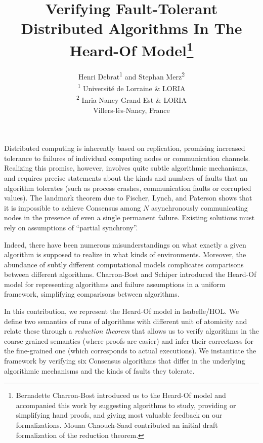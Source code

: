 \documentclass[11pt,a4paper]{article}
\begin{document}
\title{
  Verifying Fault-Tolerant Distributed Algorithms In The Heard-Of Model\thanks{%
    Bernadette Charron-Bost introduced us to the Heard-Of model and
    accompanied this work by suggesting algorithms to study, providing
    or simplifying hand proofs, and giving most valuable feedback on
    our formalizations. Mouna Chaouch-Saad contributed an initial
    draft formalization of the reduction theorem.
  }
}
\author{
  Henri Debrat\textsuperscript{1} and Stephan Merz\textsuperscript{2}\\
  \mbox{}\textsuperscript{1} Universit\'e de Lorraine \& LORIA\\
  \mbox{}\textsuperscript{2} Inria Nancy Grand-Est \& LORIA\\
  Villers-l\`es-Nancy, France
}
\maketitle

Distributed computing is inherently based on replication, promising
increased tolerance to failures of individual computing nodes or
communication channels. Realizing this promise, however, involves
quite subtle algorithmic mechanisms, and requires precise statements
about the kinds and numbers of faults that an algorithm tolerates (such
as process crashes, communication faults or corrupted values).  The
landmark theorem due to Fischer, Lynch, and Paterson shows that it is
impossible to achieve Consensus among $N$ asynchronously communicating
nodes in the presence of even a single permanent failure. Existing
solutions must rely on assumptions of ``partial synchrony''.

Indeed, there have been numerous misunderstandings on what exactly a given
algorithm is supposed to realize in what kinds of environments. Moreover, the
abundance of subtly different computational models complicates comparisons
between different algorithms. Charron-Bost and Schiper introduced the Heard-Of
model for representing algorithms and failure assumptions in a uniform
framework, simplifying comparisons between algorithms.

In this contribution, we represent the Heard-Of model in Isabelle/HOL. We define
two semantics of runs of algorithms with different unit of atomicity and relate
these through a \emph{reduction theorem} that allows us to verify algorithms in the
coarse-grained semantics (where proofs are easier) and infer their correctness
for the fine-grained one (which corresponds to actual executions). We
instantiate the framework by verifying six Consensus algorithms that differ in
the underlying algorithmic mechanisms and the kinds of faults they tolerate.
\end{document}
